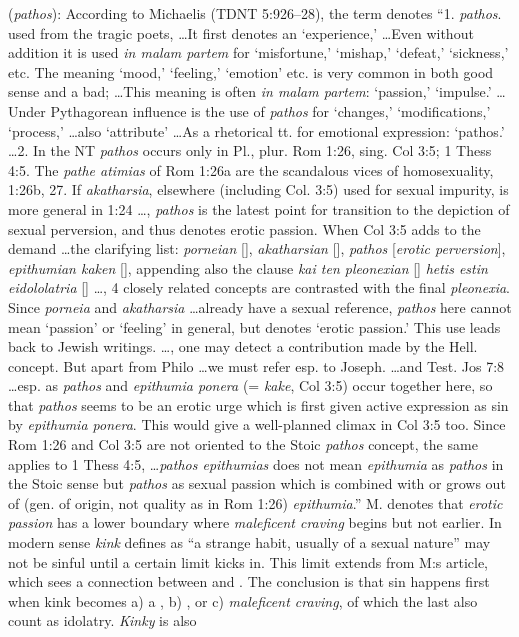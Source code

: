 \item[Erotic perversion,]

(\textit{pathos}):
According to Michaelis (TDNT 5:926--28), the term denotes ``1. \emph{pathos}. used from the tragic poets, \ldots It first denotes an `experience,' \ldots Even without addition it is used \emph{in malam partem} for `misfortune,' `mishap,' `defeat,' `sickness,' etc. The meaning `mood,' `feeling,' `emotion' etc. is very common in both good sense and a bad; \ldots This meaning is often \emph{in malam partem}: `passion,' `impulse.' \ldots Under Pythagorean influence is the use of \emph{pathos} for `changes,' `modifications,' `process,' \ldots also `attribute' \ldots As a rhetorical tt. for emotional expression: `pathos.' \ldots 2. In the NT \emph{pathos} occurs only in Pl., plur. Rom 1:26, sing. Col 3:5; 1 Thess 4:5. The \emph{pathe atimias} of Rom 1:26a are the scandalous vices of homosexuality, 1:26b, 27. If \emph{akatharsia}, elsewhere (including Col. 3:5) used for sexual impurity, is more general in 1:24 \ldots, \emph{pathos} is the latest point for transition to the depiction of sexual perversion, and thus denotes erotic passion. When Col 3:5 adds to the demand \ldots the clarifying list: \emph{porneian} [], \emph{akatharsian} [], \emph{pathos} [\emph{erotic perversion}], \emph{epithumian kaken} [], appending also the clause \emph{kai ten pleonexian} [] \emph{hetis estin eidololatria} [] \ldots, 4 closely related concepts are contrasted with the final \emph{pleonexia}. Since \emph{porneia} and \emph{akatharsia} \ldots already have a sexual reference, \emph{pathos} here cannot mean `passion' or `feeling' in general, but denotes `erotic passion.' This use leads back to Jewish writings. \ldots, one may detect a contribution made by the Hell. concept. But apart from Philo \ldots we must refer esp. to Joseph. \ldots and Test. Jos 7:8 \ldots esp. as \emph{pathos} and \emph{epithumia ponera} (= \emph{kake}, Col 3:5) occur together here, so that \emph{pathos} seems to be an erotic urge which is first given active expression as sin by \emph{epithumia ponera}. This would give a well-planned climax in Col 3:5 too. Since Rom 1:26 and Col 3:5 are not oriented to the Stoic \emph{pathos} concept, the same applies to 1 Thess 4:5, \ldots \emph{pathos epithumias} does not mean \emph{epithumia} as \emph{pathos} in the Stoic sense but \emph{pathos} as sexual passion which is combined with or grows out of (gen. of origin, not quality as in Rom 1:26) \emph{epithumia}.'' M. denotes that \emph{erotic passion} has a lower boundary where \emph{maleficent craving} begins but not earlier. In modern sense \emph{kink} defines as ``a strange habit, usually of a sexual nature'' may not be sinful until a certain limit kicks in. This limit extends from M:s article, which sees a connection between  and . The conclusion is that sin happens first when kink becomes a) a , b) , or c) \emph{maleficent craving}, of which the last also count as idolatry. \emph{Kinky} is also 